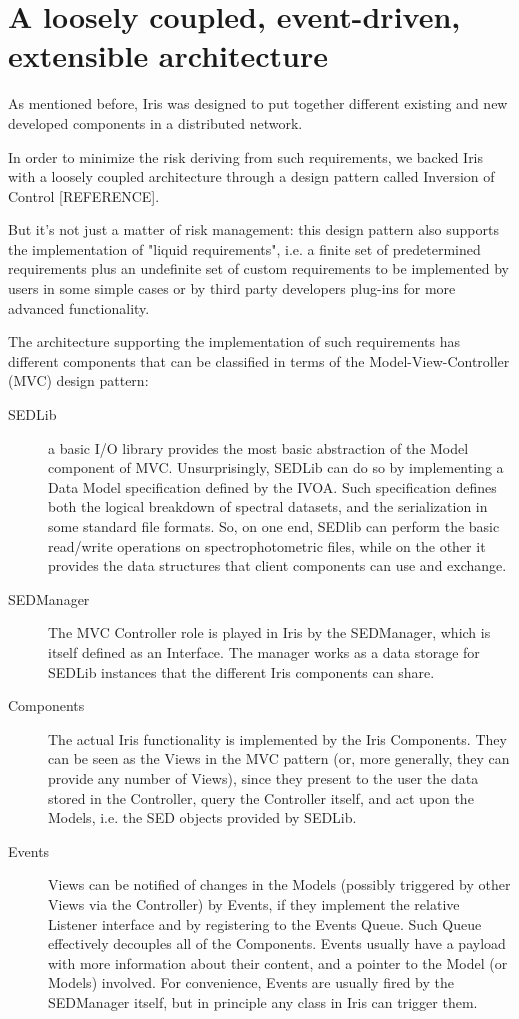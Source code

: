 \section{A loosely coupled, event-driven, extensible architecture}
\label{sec:architecture}

As mentioned before, Iris was designed to put together different existing and new developed components in a distributed network.

In order to minimize the risk deriving from such requirements, we backed Iris with a loosely coupled architecture through a design pattern called Inversion of Control [REFERENCE].

But it's not just a matter of risk management: this design pattern also supports the implementation of "liquid requirements", i.e. a finite set of predetermined requirements plus an undefinite set of custom requirements to be implemented by users in some simple cases or by third party developers plug-ins for more advanced functionality.

The architecture supporting the implementation of such requirements has different components that can be classified in terms of the Model-View-Controller (MVC) design pattern:
\begin{description}
\item[SEDLib] a basic I/O library provides the most basic abstraction of the Model component of MVC. Unsurprisingly, SEDLib can do so by implementing a Data Model specification defined by the IVOA. Such specification defines both the logical breakdown of spectral datasets, and the serialization in some standard file formats. So, on one end, SEDlib can perform the basic read/write operations on spectrophotometric files, while on the other it provides the data structures that client components can use and exchange.
\item[SEDManager] The MVC Controller role is played in Iris by the SEDManager, which is itself defined as an Interface. The manager works as a data storage for SEDLib instances that the different Iris components can share.
\item[Components] The actual Iris functionality is implemented by the Iris Components. They can be seen as the Views in the MVC pattern (or, more generally, they can provide any number of Views), since they present to the user the data stored in the Controller, query the Controller itself, and act upon the Models, i.e. the SED objects provided by SEDLib.
\item[Events] Views can be notified of changes in the Models (possibly triggered by other Views via the Controller) by Events, if they implement the relative Listener interface and by registering to the Events Queue. Such Queue effectively decouples all of the Components. Events usually have a payload with more information about their content, and a pointer to the Model (or Models) involved. For convenience, Events are usually fired by the SEDManager itself, but in principle any class in Iris can trigger them.
\end{description}

